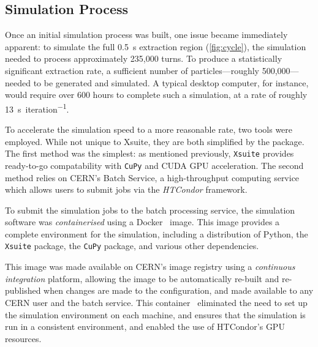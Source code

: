 \documentclass[11pt]{report}
\begin{document}
\subsection{Simulation Process}\label{sec:sim_process}

Once an initial simulation process was built, one issue became immediately apparent: to simulate the full \qty{0.5}{\second} extraction region (\autoref{fig:cycle}), the simulation needed to process approximately 235,000 turns. To produce a statistically significant extraction rate, a sufficient number of particles---roughly 500,000---needed to be generated and simulated. A typical desktop computer, for instance, would require over 600 hours to complete such a simulation, at a rate of roughly \qty{13}{\second\per iteration}.

To accelerate the simulation speed to a more reasonable rate, two tools were employed. While not unique to Xsuite, they are both simplified by the package. The first method was the simplest: as mentioned previously, \verb|Xsuite| provides ready-to-go compatability with \verb|CuPy| and CUDA GPU acceleration. The second method relies on CERN's Batch Service, a high-throughput computing service which allows users to submit jobs via the \textit{HTCondor} framework. 

To submit the simulation jobs to the batch processing service, the simulation software was \textit{containerised} using a Docker~\cite{merkel2014docker} image. This image provides a complete environment for the simulation, including a distribution of Python, the \verb|Xsuite| package, the \verb|CuPy| package, and various other dependencies. 

This image was made available on CERN's image registry using a \textit{continuous integration} platform, allowing the image to be automatically re-built and re-published when changes are made to the configuration, and made available to any CERN user and the batch service. This container~\cite{docker} eliminated the need to set up the simulation environment on each machine, and ensures that the simulation is run in a consistent environment, and enabled the use of HTCondor's GPU resources. 
\end{document}
